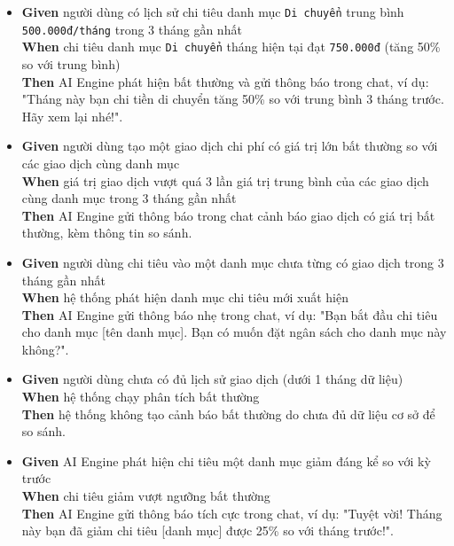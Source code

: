 \begin{itemize}
\item \textbf{Given} người dùng có lịch sử chi tiêu danh mục \texttt{Di chuyển} trung bình \texttt{500.000đ/tháng} trong 3 tháng gần nhất  \\ \hspace*{1.5em}  \textbf{When} chi tiêu danh mục \texttt{Di chuyển} tháng hiện tại đạt \texttt{750.000đ} (tăng 50\% so với trung bình)  \\ \hspace*{1.5em}  \textbf{Then} AI Engine phát hiện bất thường và gửi thông báo trong chat, ví dụ: "Tháng này bạn chi tiền di chuyển tăng 50\% so với trung bình 3 tháng trước. Hãy xem lại nhé!".
\item \textbf{Given} người dùng tạo một giao dịch chi phí có giá trị lớn bất thường so với các giao dịch cùng danh mục  \\ \hspace*{1.5em}  \textbf{When} giá trị giao dịch vượt quá 3 lần giá trị trung bình của các giao dịch cùng danh mục trong 3 tháng gần nhất  \\ \hspace*{1.5em}  \textbf{Then} AI Engine gửi thông báo trong chat cảnh báo giao dịch có giá trị bất thường, kèm thông tin so sánh.
\item \textbf{Given} người dùng chi tiêu vào một danh mục chưa từng có giao dịch trong 3 tháng gần nhất  \\ \hspace*{1.5em}  \textbf{When} hệ thống phát hiện danh mục chi tiêu mới xuất hiện  \\ \hspace*{1.5em}  \textbf{Then} AI Engine gửi thông báo nhẹ trong chat, ví dụ: "Bạn bắt đầu chi tiêu cho danh mục [tên danh mục]. Bạn có muốn đặt ngân sách cho danh mục này không?".
\item \textbf{Given} người dùng chưa có đủ lịch sử giao dịch (dưới 1 tháng dữ liệu)  \\ \hspace*{1.5em}  \textbf{When} hệ thống chạy phân tích bất thường  \\ \hspace*{1.5em}  \textbf{Then} hệ thống không tạo cảnh báo bất thường do chưa đủ dữ liệu cơ sở để so sánh.
\item \textbf{Given} AI Engine phát hiện chi tiêu một danh mục giảm đáng kể so với kỳ trước  \\ \hspace*{1.5em}  \textbf{When} chi tiêu giảm vượt ngưỡng bất thường  \\ \hspace*{1.5em}  \textbf{Then} AI Engine gửi thông báo tích cực trong chat, ví dụ: "Tuyệt vời! Tháng này bạn đã giảm chi tiêu [danh mục] được 25\% so với tháng trước!".

\end{itemize}
